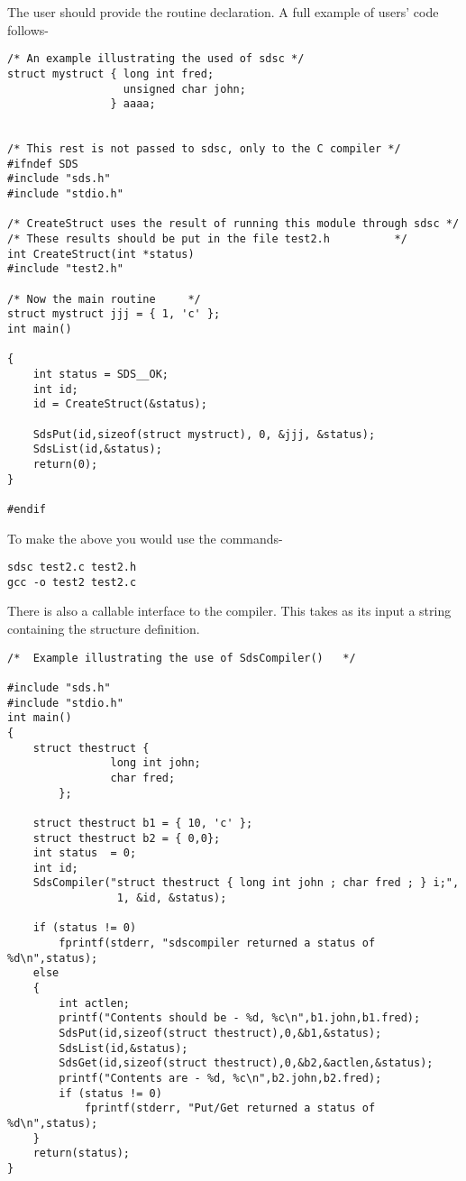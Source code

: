 The user should provide the routine declaration.  A full example of
users' code follows-
\begin{verbatim}
/* An example illustrating the used of sdsc */
struct mystruct { long int fred;
                  unsigned char john;
                } aaaa;


/* This rest is not passed to sdsc, only to the C compiler */
#ifndef SDS
#include "sds.h"
#include "stdio.h"

/* CreateStruct uses the result of running this module through sdsc */
/* These results should be put in the file test2.h		    */
int CreateStruct(int *status)
#include "test2.h"

/* Now the main routine		*/
struct mystruct jjj = { 1, 'c' };
int main()

{
    int status = SDS__OK;
    int id;
    id = CreateStruct(&status);

    SdsPut(id,sizeof(struct mystruct), 0, &jjj, &status);	
    SdsList(id,&status);
    return(0);
}

#endif
\end{verbatim}
To make the above you would use the commands-
\begin{verbatim}
sdsc test2.c test2.h
gcc -o test2 test2.c
\end{verbatim}

There is also a callable interface to the compiler.  This takes as its input
a string containing the structure definition.  

\begin{verbatim}
/*  Example illustrating the use of SdsCompiler()	*/

#include "sds.h"
#include "stdio.h"
int main()
{
    struct thestruct {
                long int john;
               	char fred;
		};

    struct thestruct b1 = { 10, 'c' };
    struct thestruct b2 = { 0,0};
    int status  = 0;
    int id;
    SdsCompiler("struct thestruct { long int john ; char fred ; } i;",
                 1, &id, &status);
   
    if (status != 0)
        fprintf(stderr, "sdscompiler returned a status of %d\n",status);
    else
    {
        int actlen;
        printf("Contents should be - %d, %c\n",b1.john,b1.fred);
        SdsPut(id,sizeof(struct thestruct),0,&b1,&status);
        SdsList(id,&status);
        SdsGet(id,sizeof(struct thestruct),0,&b2,&actlen,&status);
        printf("Contents are - %d, %c\n",b2.john,b2.fred);
        if (status != 0)
            fprintf(stderr, "Put/Get returned a status of %d\n",status);
    }
    return(status);
} 
\end{verbatim}


